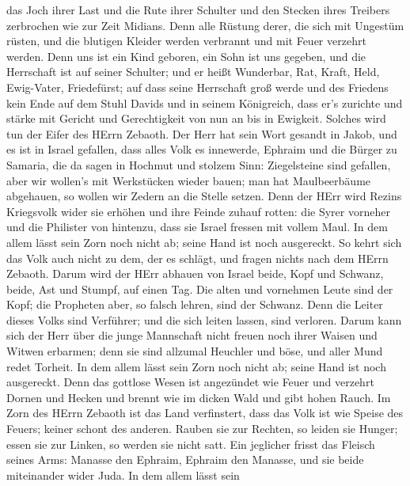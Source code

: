 das Joch ihrer Last und die Rute ihrer Schulter und den Stecken ihres
Treibers zerbrochen wie zur Zeit Midians.  Denn alle Rüstung
derer, die sich mit Ungestüm rüsten, und die blutigen Kleider werden
verbrannt und mit Feuer verzehrt werden.  Denn uns ist ein
Kind geboren, ein Sohn ist uns gegeben, und die Herrschaft ist auf
seiner Schulter; und er heißt Wunderbar, Rat, Kraft, Held, Ewig-Vater,
Friedefürst;  auf dass seine Herrschaft groß werde und des
Friedens kein Ende auf dem Stuhl Davids und in seinem Königreich, dass
er's zurichte und stärke mit Gericht und Gerechtigkeit von nun an bis in
Ewigkeit. Solches wird tun der Eifer des HErrn Zebaoth.  Der
Herr hat sein Wort gesandt in Jakob, und es ist in Israel gefallen,
 dass alles Volk es innewerde, Ephraim und die Bürger zu
Samaria, die da sagen in Hochmut und stolzem Sinn: 
Ziegelsteine sind gefallen, aber wir wollen's mit Werkstücken wieder
bauen; man hat Maulbeerbäume abgehauen, so wollen wir Zedern an die
Stelle setzen.  Denn der HErr wird Rezins Kriegsvolk wider
sie erhöhen und ihre Feinde zuhauf rotten:  die Syrer
vorneher und die Philister von hintenzu, dass sie Israel fressen mit
vollem Maul. In dem allem lässt sein Zorn noch nicht ab; seine Hand ist
noch ausgereckt.  So kehrt sich das Volk auch nicht zu dem,
der es schlägt, und fragen nichts nach dem HErrn Zebaoth. 
Darum wird der HErr abhauen von Israel beide, Kopf und Schwanz, beide,
Ast und Stumpf, auf einen Tag.  Die alten und vornehmen
Leute sind der Kopf; die Propheten aber, so falsch lehren, sind der
Schwanz.  Denn die Leiter dieses Volks sind Verführer; und
die sich leiten lassen, sind verloren.  Darum kann sich der
Herr über die junge Mannschaft nicht freuen noch ihrer Waisen und Witwen
erbarmen; denn sie sind allzumal Heuchler und böse, und aller Mund redet
Torheit. In dem allem lässt sein Zorn noch nicht ab; seine Hand ist noch
ausgereckt.  Denn das gottlose Wesen ist angezündet wie
Feuer und verzehrt Dornen und Hecken und brennt wie im dicken Wald und
gibt hohen Rauch.  Im Zorn des HErrn Zebaoth ist das Land
verfinstert, dass das Volk ist wie Speise des Feuers; keiner schont des
anderen.  Rauben sie zur Rechten, so leiden sie Hunger;
essen sie zur Linken, so werden sie nicht satt. Ein jeglicher frisst das
Fleisch seines Arms:  Manasse den Ephraim, Ephraim den
Manasse, und sie beide miteinander wider Juda. In dem allem lässt sein
